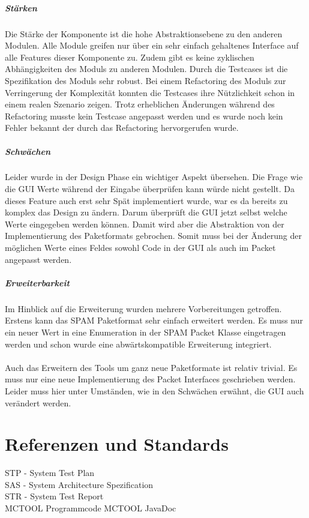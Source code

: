 \paragraph{Stärken} Die Stärke der Komponente ist die hohe Abstraktionsebene zu den anderen
Modulen. Alle Module greifen nur über ein sehr einfach gehaltenes Interface auf
alle Features dieser Komponente zu. Zudem gibt es keine zyklischen Abhängigkeiten 
des Moduls zu anderen Modulen. Durch die Testcases ist die Spezifikation des Moduls 
sehr robust. Bei einem Refactoring des Moduls zur Verringerung der Komplexität konnten
die Testcases ihre Nützlichkeit schon in einem realen Szenario zeigen. Trotz erheblichen
Änderungen während des Refactoring musste kein Testcase angepasst werden und es 
wurde noch kein Fehler bekannt der durch das Refactoring hervorgerufen wurde.

\paragraph{Schwächen} Leider wurde in der Design Phase ein wichtiger Aspekt übersehen.
Die Frage wie die GUI Werte während der Eingabe überprüfen kann würde nicht gestellt.
Da dieses Feature auch erst sehr Spät implementiert wurde, war es da bereits zu 
komplex das Design zu ändern. Darum überprüft die GUI jetzt selbst welche Werte 
eingegeben werden können. Damit wird aber die Abstraktion von der Implementierung
des Paketformats gebrochen. Somit muss bei der Änderung der möglichen Werte eines Feldes
sowohl Code in der GUI als auch im Packet angepasst werden.

\paragraph{Erweiterbarkeit} Im Hinblick auf die Erweiterung wurden mehrere Vorbereitungen
getroffen.
Erstens kann das SPAM Paketformat sehr einfach erweitert werden. Es muss nur ein
neuer Wert in eine Enumeration in der SPAM Packet Klasse eingetragen werden und 
schon wurde eine abwärtskompatible Erweiterung integriert.
\\\\
Auch das Erweitern des Tools um ganz neue Paketformate ist relativ trivial. Es muss nur 
eine neue Implementierung des Packet Interfaces geschrieben werden. Leider muss hier 
unter Umständen, wie in den Schwächen erwähnt, die GUI auch verändert werden.

\chapter{Referenzen und Standards}
STP - System Test Plan  \\
SAS - System Architecture Spezification\\
STR - System Test Report\\
MCTOOL Programmcode MCTOOL JavaDoc\\
